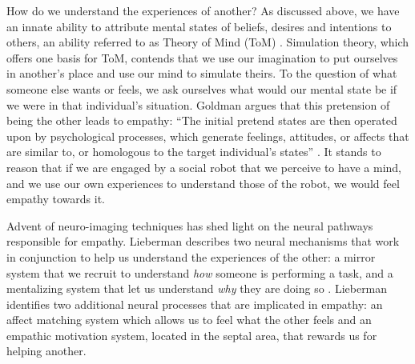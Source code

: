 How do we understand the experiences of another? As discussed above, we have an innate ability to attribute mental states of beliefs, desires and intentions to others, an ability referred to as Theory of Mind (ToM) \cite{frith_social_cognition}. Simulation theory, which offers one basis for ToM, contends that we use our imagination to put ourselves in another's place and use our mind to simulate theirs. To the question of what someone else wants or feels, we ask ourselves what would our mental state be if we were in that individual's situation. Goldman argues that this pretension of being the other leads to empathy: ``The initial pretend states are then operated upon by psychological processes, which generate feelings, attitudes, or affects that are similar to, or homologous to the target individual's states'' \cite{goldman_empathy_mind_morals}. It stands to reason that if we are engaged by a social robot that we perceive to have a mind, and we use our own experiences to understand those of the robot, we would feel empathy towards it. 

Advent of neuro-imaging techniques has shed light on the neural pathways responsible for empathy. Lieberman describes two neural mechanisms that work in conjunction to help us understand the experiences of the other: a mirror system that we recruit to understand \emph{how} someone is performing a task, and a mentalizing system that let us understand \emph{why} they are doing so \cite{lieberman_social}. Lieberman identifies two additional neural processes that are implicated in empathy: an affect matching system which allows us to feel what the other feels and an empathic motivation system, located in the septal area, that rewards us for helping another. 

%


